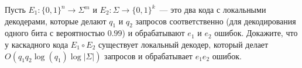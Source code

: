 Пусть $E_1: \{0, 1\}^n \to \Sigma^m$ и $E_2: \Sigma \to \{0, 1\}^k$~--- это два кода с локальными декодерами, которые делают
$q_1$ и $q_2$ запросов соответственно (для декодирования одного бита с вероятностью $0.99$) и обрабатывают $e_1$ и $e_2$
ошибок. Докажите, что у каскадного кода $E_1 \circ E_2$ существует локальный декодер, который делает $O(q_1 q_2 \log (q_1)
\log |\Sigma|)$ запросов и обрабатывает $e_1 e_2$ ошибок.